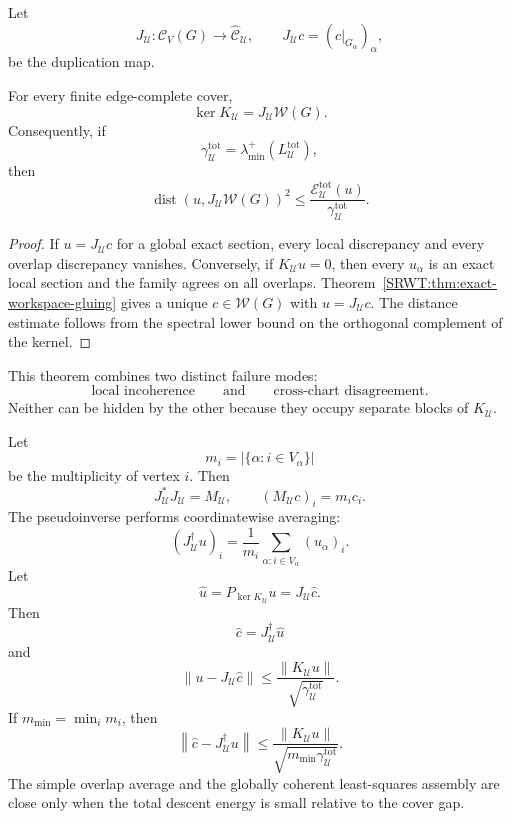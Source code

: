 Let
\[
J_{\mathcal U}:\mathcal C_V(G)\to\widehat{\mathcal C}_{\mathcal U},
\qquad
J_{\mathcal U}c=(c|_{G_\alpha})_\alpha,
\]
be the duplication map.

\begin{SRWTtheorem}\label{SRWT:thm:total-descent-kernel}
For every finite edge-complete cover,
\[
\boxed{
\ker K_{\mathcal U}
=
J_{\mathcal U}\mathscr W(G).
}
\]
Consequently, if
\[
\gamma_{\mathcal U}^{\mathrm{tot}}
=
\lambda_{\min}^+
\left(L_{\mathcal U}^{\mathrm{tot}}\right),
\]
then
\[
\boxed{
\operatorname{dist}
\left(
 u,
 J_{\mathcal U}\mathscr W(G)
\right)^2
\leq
\frac{\mathcal E_{\mathcal U}^{\mathrm{tot}}(u)}
{\gamma_{\mathcal U}^{\mathrm{tot}}}.
}
\]
\end{SRWTtheorem}

\begin{proof}
If \(u=J_{\mathcal U}c\) for a global exact section, every local discrepancy
and every overlap discrepancy vanishes. Conversely, if \(K_{\mathcal U}u=0\),
then every \(u_\alpha\) is an exact local section and the family agrees on all
overlaps. Theorem~\ref{SRWT:thm:exact-workspace-gluing} gives a unique
\(c\in\mathscr W(G)\) with \(u=J_{\mathcal U}c\). The distance estimate follows
from the spectral lower bound on the orthogonal complement of the kernel.
\end{proof}

This theorem combines two distinct failure modes:
\[
\text{local incoherence}
\qquad\text{and}\qquad
\text{cross-chart disagreement}.
\]
Neither can be hidden by the other because they occupy separate blocks of
\(K_{\mathcal U}\).


Let
\[
m_i=|\{\alpha:i\in V_\alpha\}|
\]
be the multiplicity of vertex \(i\). Then
\[
J_{\mathcal U}^*J_{\mathcal U}=M_{\mathcal U},
\qquad
(M_{\mathcal U}c)_i=m_ic_i.
\]
The pseudoinverse performs coordinatewise averaging:
\[
\boxed{
(J_{\mathcal U}^\dagger u)_i
=
\frac{1}{m_i}
\sum_{\alpha:i\in V_\alpha}(u_\alpha)_i.
}
\]
Let
\[
\widehat u
=
P_{\ker K_{\mathcal U}}u
=
J_{\mathcal U}\widehat c.
\]
Then
\[
\widehat c
=
J_{\mathcal U}^\dagger\widehat u
\]
and
\[
\boxed{
\|u-J_{\mathcal U}\widehat c\|
\leq
\frac{\|K_{\mathcal U}u\|}
{\sqrt{\gamma_{\mathcal U}^{\mathrm{tot}}}}.
}
\]
If \(m_{\min}=\min_i m_i\), then
\[
\boxed{
\left\|
\widehat c-J_{\mathcal U}^\dagger u
\right\|
\leq
\frac{\|K_{\mathcal U}u\|}
{\sqrt{m_{\min}\gamma_{\mathcal U}^{\mathrm{tot}}}}.
}
\]
The simple overlap average and the globally coherent least-squares assembly
are close only when the total descent energy is small relative to the cover
gap.

